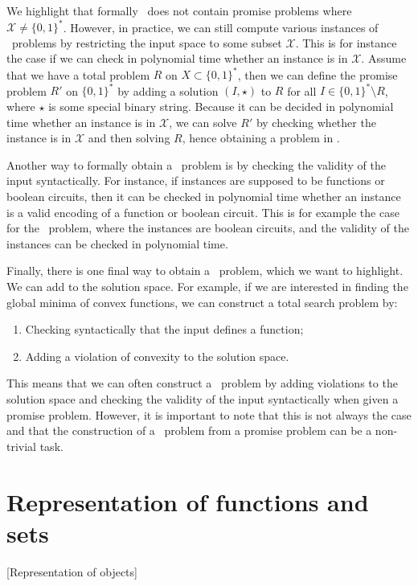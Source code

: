 We highlight that formally \TFNP\ does not contain promise problems where $\mathcal{X} \neq \{0, 1\}^*$. However, in practice, we can still compute various instances of \TFNP\ problems by restricting the input space to some subset $\mathcal{X}$. This is for instance the case if we can check in polynomial time whether an instance is in $\mathcal{X}$. Assume that we have a total problem $R$ on $X \subset \{0, 1\}^*$, then we can define the promise problem $R'$ on $\{0, 1\}^*$ by adding a solution $(I, \star)$ to $R$ for all $I \in \{0, 1\}^* \setminus R$, where $\star$ is some special binary string. Because it can be decided in polynomial time whether an instance is in $\mathcal{X}$, we can solve $R'$ by checking whether the instance is in $\mathcal{X}$ and then solving $R$, hence obtaining a problem in \TFNP.

Another way to formally obtain a \TFNP\ problem is by checking the validity of the input syntactically. For instance, if instances are supposed to be functions or boolean circuits, then it can be checked in polynomial time whether an instance is a valid encoding of a function or boolean circuit. This is for example the case for the \Tarski\ problem, where the instances are boolean circuits, and the validity of the instances can be checked in polynomial time.

Finally, there is one final way to obtain a \TFNP\ problem, which we want to highlight. We can add  to the solution space. For example, if we are interested in finding the global minima of convex functions, we can construct a total search problem by:
\begin{enumerate}
    \item Checking syntactically that the input defines a function;
    \item Adding a violation of convexity to the solution space.
\end{enumerate}

This means that we can often construct a \TFNP\ problem by adding violations to the solution space and checking the validity of the input syntactically when given a promise problem. However, it is important to note that this is not always the case and that the construction of a \TFNP\ problem from a promise problem can be a non-trivial task.

\section{Representation of functions and sets}[Representation of objects]

